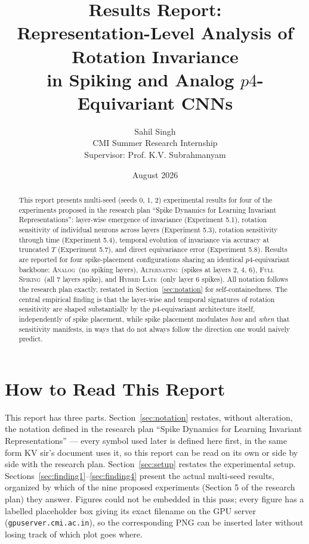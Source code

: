 \documentclass[11pt]{article}
\title{\Large Results Report:\\
Representation-Level Analysis of Rotation Invariance\\
in Spiking and Analog $p4$-Equivariant CNNs}
\author{Sahil Singh\\
CMI Summer Research Internship\\
Supervisor: Prof. K.V. Subrahmanyam}
\date{August 2026}
\newcommand{\Analog}{\textsc{Analog}}
\newcommand{\Alternating}{\textsc{Alternating}}
\newcommand{\FullSpiking}{\textsc{Full Spiking}}
\newcommand{\HybridLate}{\textsc{Hybrid Late}}
\begin{document}
\maketitle

\begin{abstract}
This report presents multi-seed (seeds 0, 1, 2) experimental results for four of the experiments
proposed in the research plan ``Spike Dynamics for Learning Invariant Representations'': layer-wise
emergence of invariance (Experiment 5.1), rotation sensitivity of individual neurons across layers
(Experiment 5.3), rotation sensitivity through time (Experiment 5.4), temporal evolution of
invariance via accuracy at truncated $T$ (Experiment 5.7), and direct equivariance error
(Experiment 5.8). Results are reported for four spike-placement configurations sharing an identical
$p4$-equivariant backbone: \Analog\ (no spiking layers), \Alternating\ (spikes at layers 2, 4, 6),
\FullSpiking\ (all 7 layers spike), and \HybridLate\ (only layer 6 spikes). All notation follows the
research plan exactly, restated in Section~\ref{sec:notation} for self-containedness. The central
empirical finding is that the layer-wise and temporal signatures of rotation sensitivity are shaped
substantially by the $p4$-equivariant architecture itself, independently of spike placement, while
spike placement modulates \emph{how} and \emph{when} that sensitivity manifests, in ways that do not
always follow the direction one would naively predict.
\end{abstract}

\tableofcontents

\section{How to Read This Report}

This report has three parts. Section~\ref{sec:notation} restates, without alteration, the notation
defined in the research plan ``Spike Dynamics for Learning Invariant Representations'' --- every
symbol used later is defined here first, in the same form KV sir's document uses it, so this report
can be read on its own or side by side with the research plan. Section~\ref{sec:setup} restates the
experimental setup. Sections~\ref{sec:finding1}--\ref{sec:finding4} present the actual multi-seed
results, organized by which of the nine proposed experiments (Section 5 of the research plan) they
answer. Figures could not be embedded in this pass; every figure has a labelled placeholder box
giving its exact filename on the GPU server (\texttt{gpuserver.cmi.ac.in}), so the corresponding PNG
can be inserted later without losing track of which plot goes where.
\end{document}
